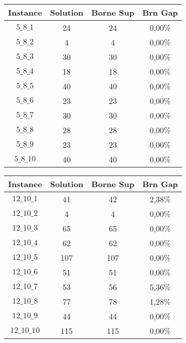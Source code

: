 \documentclass[a4paper, 11pt]{article} %
\begin{document}
\begin{center}
\begin{figure}[H]
   \begin{minipage}[c]{.46\linewidth}
      \begin{tabular}{|c|c|c|c|}
      \hline 
        Instance & Solution & Borne Sup & Brn Gap  \\ \hline
$5\_8\_1$ & 24 &  24 &  0,00\% \\ \hline
$5\_8\_2$ & 4 & 4 & 0,00\% \\ \hline
$5\_8\_3$ & 30 &  30 &  0,00\% \\ \hline
$5\_8\_4$ & 18 &  18 &  0,00\% \\ \hline
$5\_8\_5$ & 40 &  40 &  0,00\% \\ \hline
$5\_8\_6$ & 23 &  23 &  0,00\% \\ \hline
$5\_8\_7$ & 30 &  30 &  0,00\% \\ \hline
$5\_8\_8$ & 28 &  28 &  0,00\% \\ \hline
$5\_8\_9$ & 23 &  23 &  0,00\% \\ \hline
$5\_8\_10$ & 40 &  40 &  0,00\% \\ \hline
      \end{tabular}
   \end{minipage} \hfill
   \begin{minipage}[c]{.46\linewidth}
      \begin{tabular}{|c|c|c|c|}
      \hline 
        Instance & Solution & Borne Sup & Brn Gap  \\ \hline
$12\_10\_1$ & 41 &  42 &  2,38\% \\ \hline
$12\_10\_2$ & 4 & 4 & 0,00\% \\ \hline
$12\_10\_3$ & 65 &  65 &  0,00\% \\ \hline
$12\_10\_4$ & 62 &  62 &  0,00\% \\ \hline
$12\_10\_5$ & 107 & 107 & 0,00\% \\ \hline
$12\_10\_6$ & 51 &  51 &  0,00\% \\ \hline
$12\_10\_7$ & 53 &  56 &  5,36\% \\ \hline
$12\_10\_8$ & 77 &  78 &  1,28\% \\ \hline
$12\_10\_9$ & 44 &  44 &  0,00\% \\ \hline
$12\_10\_10$ & 115 & 115 & 0,00\% \\ \hline
      \end{tabular}
   \end{minipage}
\end{figure}


\end{center}
\end{document}
